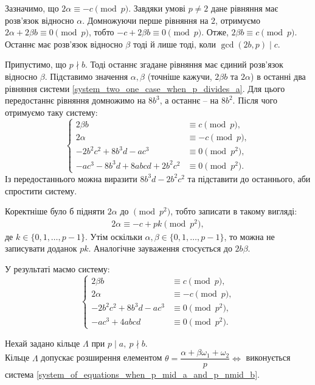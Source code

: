 \documentclass{thesis}
\begin{document}
Зазначимо, що $2\alpha \equiv -c \pmod p$. Завдяки умові $p \neq 2$ дане рівняння має розв'язок відносно $\alpha$. Домножуючи перше рівняння на $2$, отримуємо $2 \alpha + 2 \beta b \equiv 0 \pmod p$, тобто $-c + 2 \beta b \equiv 0 \pmod p$. Отже, $2 \beta b \equiv c \pmod p$. Останнє має розв'язок відносно $\beta$ тоді й лише тоді, коли $\gcd(2b,p) \mid c$.

Припустимо, що $p \nmid b$. Тоді останнє згадане рівняння має єдиний розв'язок відносно $\beta$. Підставимо значення $\alpha,\beta$ (точніше кажучи, $2\beta b$ та $2\alpha$) в останні два рівняння системи \eqref{system_two_one_case_when_p_divides_a}. Для цього передостаннє рівняння домножимо на $8b^3$, а останнє -- на $8b^2$. Після чого отримуємо таку систему:
\begin{equation*}
\begin{cases}
2 \beta b & \equiv c \pmod p, \\
2 \alpha & \equiv -c \pmod p, \\
-2 b^2 c^2 + 8b^3 d - ac^3 & \equiv 0 \pmod {p^2}, \\
- ac^3 - 8b^3d + 8abcd + 2b^2c^2 & \equiv 0 \pmod {p^2}.
\end{cases}
\end{equation*}
Із передостаннього можна виразити $8b^3d - 2b^2c^2$ та підставити до останнього, аби спростити систему.

\begin{remark}
Коректніше було б підняти $2\alpha$ до $\pmod {p^2}$, тобто записати в такому вигляді:
\begin{align*}
2 \alpha \equiv -c + p k \pmod {p^2},
\end{align*}
де $k \in \{0,1,\dots,p-1\}$. Утім оскільки $\alpha,\beta \in \{0,1,\dots,p-1\}$, то можна не записувати доданок $pk$. Аналогічне зауваження стосується до $2 b\beta$.
\end{remark}

У результаті маємо систему:
\begin{equation}
\label{system_of_equations_when_p_mid_a_and_p_nmid_b}
\begin{cases}
2 \beta b & \equiv c \pmod p, \\
2 \alpha & \equiv -c \pmod p, \\
-2 b^2 c^2 + 8b^3 d - ac^3 & \equiv 0 \pmod {p^2}, \\
-ac^3 + 4abcd & \equiv 0 \pmod {p^2}.
\end{cases}
\end{equation}

\begin{proposition}
\label{extension_for_p_mid_a_p_nmid_b_when_p_bigger_than_3}
Нехай задано кільце $\Lambda$ при $p \mid a,\ p \nmid b$.\\
Кільце $\Lambda$ допускає розширення елементом $\theta = \dfrac{\alpha + \beta \omega_1 + \omega_2}{p} \iff $ виконується система \eqref{system_of_equations_when_p_mid_a_and_p_nmid_b}.
\end{proposition}
\end{document}

